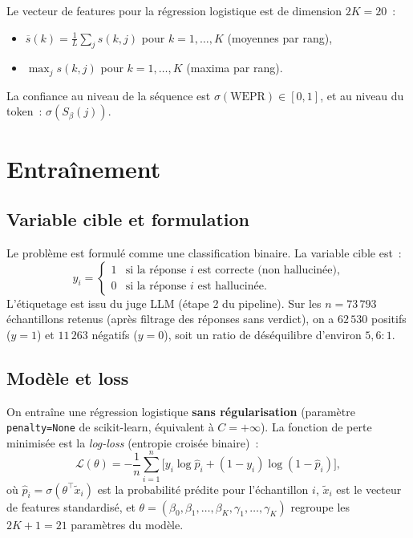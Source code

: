 \documentclass[11pt,a4paper]{article}
\begin{document}
Le vecteur de features pour la régression logistique est de dimension $2K = 20$~:
\begin{itemize}
    \item $\overline{s}(k) = \frac{1}{L}\sum_j s(k,j)$ pour $k = 1, \dots, K$ (moyennes par rang),
    \item $\max_j s(k,j)$ pour $k = 1, \dots, K$ (maxima par rang).
\end{itemize}

La confiance au niveau de la séquence est $\sigma(\text{WEPR}) \in [0, 1]$, et au niveau du token~: $\sigma(S_\beta(j))$.

\section{Entraînement}\label{sec:training}

\subsection{Variable cible et formulation}

Le problème est formulé comme une classification binaire. La variable cible est~:
\[
    y_i = \begin{cases} 1 & \text{si la réponse } i \text{ est correcte (non hallucinée),} \\ 0 & \text{si la réponse } i \text{ est hallucinée.} \end{cases}
\]
L'étiquetage est issu du juge LLM (étape 2 du pipeline). Sur les $n = 73\,793$ échantillons retenus (après filtrage des réponses sans verdict), on a $62\,530$ positifs ($y = 1$) et $11\,263$ négatifs ($y = 0$), soit un ratio de déséquilibre d'environ $5{,}6 : 1$.

\subsection{Modèle et loss}

On entraîne une régression logistique \textbf{sans régularisation} (paramètre \texttt{penalty=None} de scikit-learn, équivalent à $C = +\infty$). La fonction de perte minimisée est la \emph{log-loss} (entropie croisée binaire)~:
\begin{equation}
    \mathcal{L}(\theta) = -\frac{1}{n}\sum_{i=1}^{n} \Big[ y_i \log \hat{p}_i + (1 - y_i) \log(1 - \hat{p}_i) \Big],
\end{equation}
où $\hat{p}_i = \sigma(\theta^\top \tilde{x}_i)$ est la probabilité prédite pour l'échantillon $i$, $\tilde{x}_i$ est le vecteur de features standardisé, et $\theta = (\beta_0, \beta_1, \dots, \beta_K, \gamma_1, \dots, \gamma_K)$ regroupe les $2K + 1 = 21$ paramètres du modèle.
\end{document}
